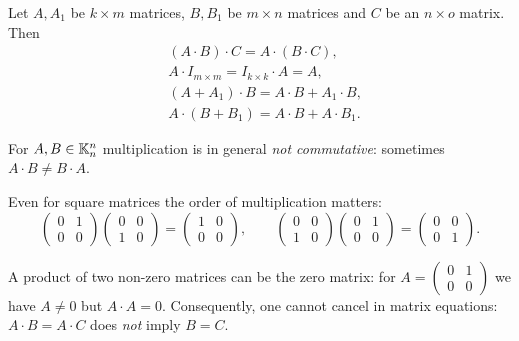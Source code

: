 \begin{theorem}
Let $A,A_1$ be $k\times m$ matrices, $B,B_1$ be $m\times n$ matrices and $C$ be an $n\times o$ matrix. Then
\[
\begin{aligned}
& (A\cdot B)\cdot C = A\cdot (B\cdot C),\\
& A\cdot I_{m\times m} = I_{k\times k} \cdot A = A,\\
& (A+A_1)\cdot B = A \cdot B +A_1\cdot B,\\
& A\cdot (B+B_1) = A \cdot B +A\cdot B_1.
\end{aligned}
\]
\end{theorem}

\begin{warning}
For $A,B\in \mathbb{K}_n^n$ multiplication is in general \emph{not commutative}: sometimes $A\cdot B \neq B\cdot A$.
\end{warning}

\begin{example}
Even for square matrices the order of multiplication matters:
\[
\left( \begin{array}{cc} 0 & 1 \\ 0 & 0 \end{array} \right)
\left( \begin{array}{cc} 0 & 0 \\ 1 & 0 \end{array} \right)
= \left( \begin{array}{cc} 1 & 0 \\ 0 & 0 \end{array} \right),
\qquad
\left( \begin{array}{cc} 0 & 0 \\ 1 & 0 \end{array} \right)
\left( \begin{array}{cc} 0 & 1 \\ 0 & 0 \end{array} \right)
= \left( \begin{array}{cc} 0 & 0 \\ 0 & 1 \end{array} \right).
\]
\end{example}

\begin{warning}
A product of two non-zero matrices can be the zero matrix: for
$A = \left( \begin{smallmatrix} 0 & 1 \\ 0 & 0 \end{smallmatrix} \right)$ we have $A\neq 0$ but
$A\cdot A = 0$. Consequently, one cannot cancel in matrix equations: $A\cdot B = A\cdot C$ does \emph{not}
imply $B = C$.
\end{warning}

